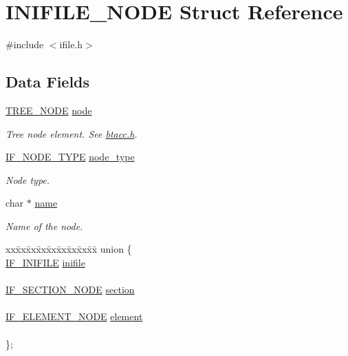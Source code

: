 \hypertarget{struct_i_n_i_f_i_l_e___n_o_d_e}{\section{I\-N\-I\-F\-I\-L\-E\-\_\-\-N\-O\-D\-E Struct Reference}
\label{struct_i_n_i_f_i_l_e___n_o_d_e}
}


{\ttfamily \#include $<$ifile.\-h$>$}

\subsection*{Data Fields}
\begin{DoxyCompactItemize}
\item 
\hyperlink{btacc_8h_a401cf184fc63368a8957143cbb772739}{T\-R\-E\-E\-\_\-\-N\-O\-D\-E} \hyperlink{struct_i_n_i_f_i_l_e___n_o_d_e_acdebf5c3c6a27c5ebd53e9854ae24214}{node}
\begin{DoxyCompactList}\small\item\em Tree node element. See \hyperlink{btacc_8h}{btacc.\-h}. \end{DoxyCompactList}\item 
\hyperlink{ifile_8h_aa33acc5a78166e20ede739b43311bc56}{I\-F\-\_\-\-N\-O\-D\-E\-\_\-\-T\-Y\-P\-E} \hyperlink{struct_i_n_i_f_i_l_e___n_o_d_e_a34ffe3d3db8e7b7cece8b906af93eabc}{node\-\_\-type}
\begin{DoxyCompactList}\small\item\em Node type. \end{DoxyCompactList}\item 
char $\ast$ \hyperlink{struct_i_n_i_f_i_l_e___n_o_d_e_a5ac083a645d964373f022d03df4849c8}{name}
\begin{DoxyCompactList}\small\item\em Name of the node. \end{DoxyCompactList}\item 
\begin{tabbing}
xx\=xx\=xx\=xx\=xx\=xx\=xx\=xx\=xx\=\kill
union \{\\
\>\hyperlink{struct_i_f___i_n_i_f_i_l_e}{IF\_INIFILE} \hyperlink{struct_i_n_i_f_i_l_e___n_o_d_e_a72ba3c5d1252090b306902900075b123}{inifile}\\
\>\\
\>\hyperlink{struct_i_f___s_e_c_t_i_o_n___n_o_d_e}{IF\_SECTION\_NODE} \hyperlink{struct_i_n_i_f_i_l_e___n_o_d_e_ad464719ecd66ed02d7177e79d78f08c0}{section}\\
\>\\
\>\hyperlink{struct_i_f___e_l_e_m_e_n_t___n_o_d_e}{IF\_ELEMENT\_NODE} \hyperlink{struct_i_n_i_f_i_l_e___n_o_d_e_a84164bc51e06ae830164ae7b047bfad7}{element}\\
\>\\
\}; \\

\end{tabbing}\end{DoxyCompactItemize}


